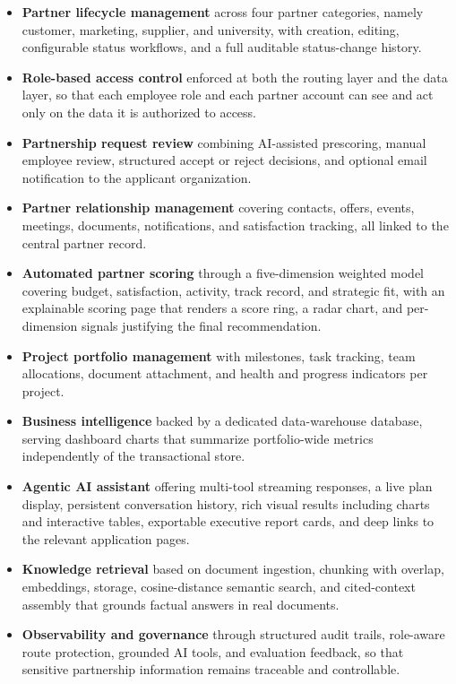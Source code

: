 \begin{itemize}
  \item \textbf{Partner lifecycle management} across four partner categories, namely customer, marketing, supplier, and university, with creation, editing, configurable status workflows, and a full auditable status-change history.
  \item \textbf{Role-based access control} enforced at both the routing layer and the data layer, so that each employee role and each partner account can see and act only on the data it is authorized to access.
  \item \textbf{Partnership request review} combining AI-assisted prescoring, manual employee review, structured accept or reject decisions, and optional email notification to the applicant organization.
  \item \textbf{Partner relationship management} covering contacts, offers, events, meetings, documents, notifications, and satisfaction tracking, all linked to the central partner record.
  \item \textbf{Automated partner scoring} through a five-dimension weighted model covering budget, satisfaction, activity, track record, and strategic fit, with an explainable scoring page that renders a score ring, a radar chart, and per-dimension signals justifying the final recommendation.
  \item \textbf{Project portfolio management} with milestones, task tracking, team allocations, document attachment, and health and progress indicators per project.
  \item \textbf{Business intelligence} backed by a dedicated data-warehouse database, serving dashboard charts that summarize portfolio-wide metrics independently of the transactional store.
  \item \textbf{Agentic AI assistant} offering multi-tool streaming responses, a live plan display, persistent conversation history, rich visual results including charts and interactive tables, exportable executive report cards, and deep links to the relevant application pages.
  \item \textbf{Knowledge retrieval} based on document ingestion, chunking with overlap, embeddings,  storage, cosine-distance semantic search, and cited-context assembly that grounds factual answers in real documents.
  \item \textbf{Observability and governance} through structured audit trails, role-aware route protection, grounded AI tools, and evaluation feedback, so that sensitive partnership information remains traceable and controllable.
\end{itemize}

